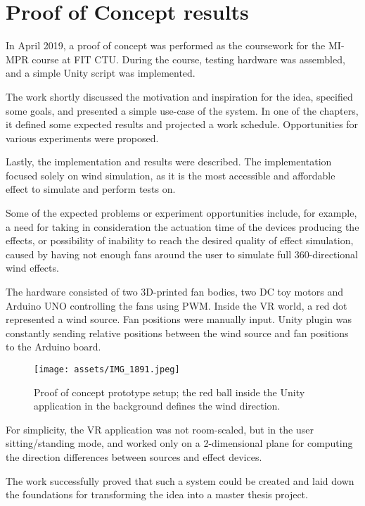 \chapter{Proof of Concept results}

In April 2019, a proof of concept was performed as the coursework for the MI-MPR
course at FIT CTU. During the course, testing hardware was assembled,
and a simple Unity script was implemented.


The work shortly discussed the motivation and inspiration for the idea,
specified some goals, and presented a simple use-case of the system. In one of the
chapters, it defined some expected results and projected a work schedule.
Opportunities for various experiments were proposed.


Lastly, the implementation and results were described. The implementation
focused solely on wind simulation, as it is the most accessible and affordable
effect to simulate and perform tests on.


Some of the expected problems or experiment opportunities include, for example,
a need for taking in consideration the actuation time of the devices producing
the effects, or possibility of inability to reach the desired quality of effect
simulation, caused by having not enough fans around the user to simulate
full 360-directional wind effects.


The hardware consisted of two 3D-printed fan bodies, two DC toy motors and Arduino
UNO controlling the fans using PWM. Inside
the VR world, a red dot represented a wind source. Fan positions were manually
input. Unity plugin was constantly sending relative positions between the
wind source and fan positions to the Arduino board.


\begin{figure}[h]{}
\centering\texttt{[image: assets/IMG\_1891.jpeg]}
\caption{
    Proof of concept prototype setup; the red ball inside the Unity application in the background defines the wind direction.
}
\end{figure}

For simplicity, the VR application was not room-scaled, but in the
user sitting/standing mode, and worked only on a 2-dimensional plane for
computing the direction differences between sources and effect devices.


The work successfully proved that such a system could be created and laid down
the foundations for transforming the idea into a master thesis project.

